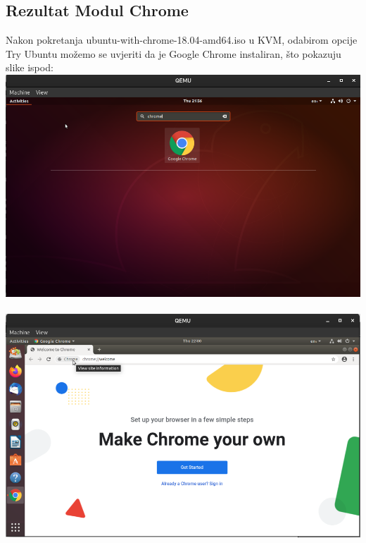 \documentclass[12pt,vi]{mitthesis}
\begin{document}
\subsection*{Rezultat Modul Chrome}
\indent
Nakon pokretanja ubuntu-with-chrome-18.04-amd64.iso u KVM, odabirom opcije Try Ubuntu možemo se uvjeriti da je Google Chrome instaliran, što pokazuju slike ispod:\\
\includegraphics[width=\linewidth]{images/chromeLive.png}\\\\
\includegraphics[width=\linewidth]{images/chromeLive2.png}\\
\end{document}
